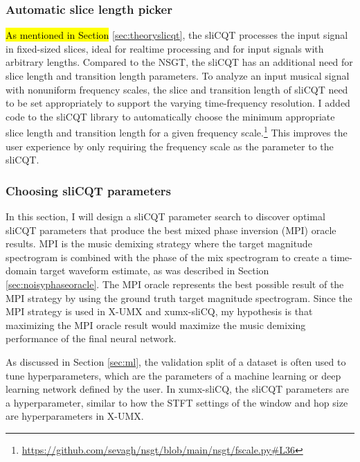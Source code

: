 \documentclass[report.tex]{subfiles}
\begin{document}
\subsubsection{Automatic slice length picker}
\label{sec:sllenpicker}

\hl{As mentioned in Section} \ref{sec:theoryslicqt}, the sliCQT processes the input signal in fixed-sized slices, ideal for realtime processing and for input signals with arbitrary lengths. Compared to the NSGT, the sliCQT has an additional need for slice length and transition length parameters. To analyze an input musical signal with nonuniform frequency scales, the slice and transition length of sliCQT need to be set appropriately to support the varying time-frequency resolution. I added code to the sliCQT library to automatically choose the minimum appropriate slice length and transition length for a given frequency scale.\footnote{\url{https://github.com/sevagh/nsgt/blob/main/nsgt/fscale.py\#L36}} This improves the user experience by only requiring the frequency scale as the parameter to the sliCQT.


\subsubsection{Choosing sliCQT parameters}
\label{sec:slicqparamsrch}

In this section, I will design a sliCQT parameter search to discover optimal sliCQT parameters that produce the best mixed phase inversion (MPI) oracle results. MPI is the music demixing strategy where the target magnitude spectrogram is combined with the phase of the mix spectrogram to create a time-domain target waveform estimate, as was described in Section \ref{sec:noisyphaseoracle}. The MPI oracle represents the best possible result of the MPI strategy by using the ground truth target magnitude spectrogram. Since the MPI strategy is used in X-UMX and xumx-sliCQ, my hypothesis is that maximizing the MPI oracle result would maximize the music demixing performance of the final neural network.

As discussed in Section \ref{sec:ml}, the validation split of a dataset is often used to tune hyperparameters, which are the parameters of a machine learning or deep learning network defined by the user. In xumx-sliCQ, the sliCQT parameters are a hyperparameter, similar to how the STFT settings of the window and hop size are hyperparameters in X-UMX.
\end{document}
